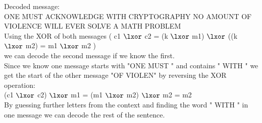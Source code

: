 Decoded message: \\
ONE MUST ACKNOWLEDGE WITH CRYPTOGRAPHY NO AMOUNT OF VIOLENCE WILL EVER SOLVE A MATH PROBLEM \\

Using the XOR of both messages ( c1  \(\lxor\) c2 = (k  \(\lxor\) m1)  \(\lxor\) ((k  \(\lxor\) m2) = m1  \(\lxor\) m2 ) \\
we can decode the second message if we know the first. \\
Since we know one message starts with "ONE MUST " and contains " WITH " we get the start of the other message "OF VIOLEN" by reversing the XOR operation: \\
 (c1  \(\lxor\) c2)    \(\lxor\) m1 =  (m1  \(\lxor\) m2)  \(\lxor\) m2 = m2 \\
By guessing further letters from the context and finding the word " WITH " in one message we can decode the rest of the sentence. \\

